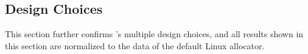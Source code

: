 



 

\subsection{Design Choices}
\label{sec:design}

This section further confirms \NM{}'s multiple design choices, and all results shown in this section are normalized to the data of the default Linux allocator.  




